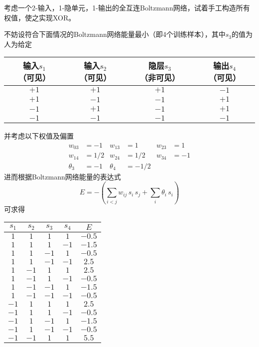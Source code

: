 \documentclass[reportComp]{thesis}
\begin{document}
\begin{question}[\textsection 7 Q10]
考虑一个2-输入，1-隐单元，1-输出的全互连Boltzmann网络，试着手工构造所有权值，使之实现XOR。
\end{question}
\begin{answer}
不妨设符合下面情况的Boltzmann网络能量最小（即4个训练样本），其中$s_3$的值为人为给定
\begin{center}
\begin{tabular}{cc|c|c}\hline
输入$s_1$（可见） & 输入$s_2$（可见） & 隐层$s_3$（非可见） & 输出$s_4$（可见）\\\hline
 $+1$ & $+1$ & $+1$ & $-1$\\
 $+1$ & $-1$ & $-1$ & $+1$\\
 $-1$ & $+1$ & $-1$ & $+1$\\
 $-1$ & $-1$ & $-1$ & $-1$\\\hline
\end{tabular}
\end{center}
并考虑以下权值及偏置
\[\begin{aligned}
w_{03} &= -1 & w_{13} &= 1 & w_{23} &=1 \\
w_{14} &= 1/2 & w_{24} &=1/2 & w_{34} &=-1\\
\theta_{3} &= -1 & \theta_{4} &=-1/2
\end{aligned}\]
进而根据Boltzmann网络能量的表达式
\[E=-\left(\sum _{{i<j}}w_{{ij}}\,s_{i}\,s_{j}+\sum _{i}\theta _{i}\,s_{i}\right)\]
可求得
\begin{center}
\begin{tabular}{cccc|c}\hline
$s_1$ & $s_2$ & $s_3$ & $s_4$ & $E$\\\hline
$1$ & $1$ & $1$ & $1$ & $-0.5$ \\
$1$ & $1$ & $1$ & $-1$ & $-1.5$ \\
$1$ & $1$ & $-1$ & $1$ & $-0.5$ \\
$1$ & $1$ & $-1$ & $-1$ & $2.5$ \\
$1$ & $-1$ & $1$ & $1$ & $2.5$ \\
$1$ & $-1$ & $1$ & $-1$ & $-0.5$ \\
$1$ & $-1$ & $-1$ & $1$ & $-1.5$ \\
$1$ & $-1$ & $-1$ & $-1$ & $-0.5$ \\
$-1$ & $1$ & $1$ & $1$ & $2.5$ \\
$-1$ & $1$ & $1$ & $-1$ & $-0.5$ \\
$-1$ & $1$ & $-1$ & $1$ & $-1.5$ \\
$-1$ & $1$ & $-1$ & $-1$ & $-0.5$ \\
$-1$ & $-1$ & $1$ & $1$ & $5.5$ \\

\end{tabular}
\end{center}
\end{answer}
\end{document}
